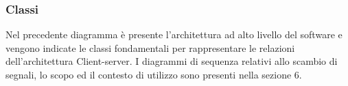 \subsubsection{Classi}
Nel precedente diagramma è presente l'architettura ad alto livello del software e vengono indicate le classi fondamentali per rappresentare le relazioni dell'architettura Client-server. I diagrammi di sequenza relativi allo scambio di segnali, lo scopo ed il contesto di utilizzo sono presenti nella sezione 6.
\begin{comment}
\subsubsubsection{Server}
La parte Server è composta da due package: ModelServer per la gestione dei dati persistenti ed il \gloss{Controller} per la gestione della \gloss{business logic}.\\
\subsubsubsubsection{ModelServer}
\immagine{./Diagrammi/ModelServerClassi}{Diagramma delle classi del ModelServer}
Nel ModelServer sono presenti oggetti che rappresentano:
\begin{itemize}
\item Il database di analisi e quello degli utenti;
\item La gestione del file \gloss{DSL} e il suo \gloss{parsing};
\item La gestione dei dati richiesti dal controller.
\end{itemize}
Tutte le operazioni di gestione, modifica e recupero dei dati vengono messe a disposizione dal model. In tal modo il controller è responsabile solamente di gestire la logica dell'applicazione.

\subsubsubsubsection{Controller}
\immagine{./Diagrammi/ControllerClassi}{Diagramma delle classi del Controller}
Il controller è responsabile dell'autenticazione delle richieste e del loro routing da Client a ModelServer e viceversa.

\subsubsubsection{Client}
\immagine{./Diagrammi/ClientClassi}{Diagramma delle classi del Client}
Nel Client sono presenti oggetti che rappresentano:
\begin{itemize}
\item I template per le pagine web;
\item I Controller per la gestione dei template;
\item Lo Scope per l'aggiornamento dei dati dei template;
\item I Servizi utilizzati dai Controller.
\end{itemize}
\end{comment}
\newpage
